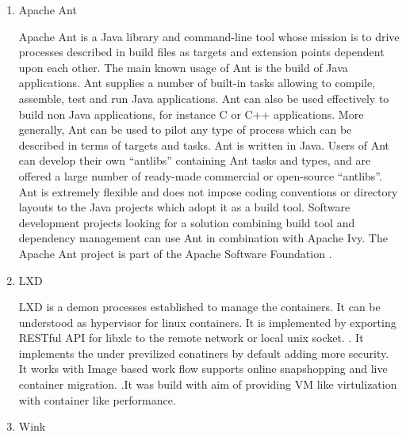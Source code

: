 \begin{enumerate}
\item {} 
Apache Ant

Apache Ant is a Java library and command-line tool whose mission
is to drive processes described in build files as targets and
extension points dependent upon each other. The main known usage
of Ant is the build of Java applications. Ant supplies a number
of built-in tasks allowing to compile, assemble, test and run
Java applications. Ant can also be used effectively to build non
Java applications, for instance C or C++ applications. More
generally, Ant can be used to pilot any type of process which can
be described in terms of targets and tasks. Ant is written in
Java. Users of Ant can develop their own ``antlibs'' containing Ant
tasks and types, and are offered a large number of ready-made
commercial or open-source ``antlibs''. Ant is extremely flexible
and does not impose coding conventions or directory layouts to
the Java projects which adopt it as a build tool. Software
development projects looking for a solution combining build tool
and dependency management can use Ant in combination with Apache
Ivy. The Apache Ant project is part of the Apache Software
Foundation \label{\detokenize{i524/technologies:id717}}{\hyperref[\detokenize{i524/technologies:ant-www}]{\sphinxcrossref{{[}625{]}}}}.

\item {} 
LXD

LXD is a  demon processes established to manage the
containers. It can be understood as hypervisor for linux
containers. It is implemented by exporting RESTful API for libxlc
to the remote network or local unix
socket. \label{\detokenize{i524/technologies:id718}}{\hyperref[\detokenize{i524/technologies:www-lxd-thevarguy}]{\sphinxcrossref{{[}626{]}}}}. It implements the under
previlized conatiners by default adding more security. It works
with Image based work flow supports online snapshopping and live
container migration. \label{\detokenize{i524/technologies:id719}}{\hyperref[\detokenize{i524/technologies:www-lxd-lists-linux}]{\sphinxcrossref{{[}627{]}}}}.It was build
with aim of providing VM like virtulization with container like
performance. \label{\detokenize{i524/technologies:id720}}{\hyperref[\detokenize{i524/technologies:www-lxd-ubuntu}]{\sphinxcrossref{{[}628{]}}}}

\item {} 
Wink


\end{enumerate}

